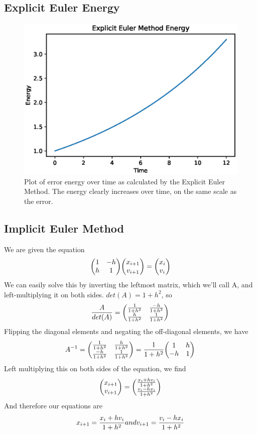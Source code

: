 \documentclass{article}
\begin{document}
\subsection{Explicit Euler Energy}

\begin{figure}[ht]
\centering
\includegraphics[scale=0.35]{exp_euler_energy.eps}
\caption{Plot of error energy over time as calculated by the Explicit Euler Method. The energy clearly increases over time, on the same scale as the error.}
\label{fig:expeulerenergy}
\end{figure}

\subsection{Implicit Euler Method}

We are given the equation 
$$
    \mqty(1 & -h \\ h & 1) \mqty(x_{i+1} \\ v_{i+1}) = \mqty(x_{i} \\ v_{i})
$$
We can easily solve this by inverting the leftmost matrix, which we'll call A, and left-multiplying it on both sides. $det(A) = 1 +h^2$, so 
$$
\frac{A}{det(A)} = \mqty(\frac{1}{1 + h^2} & \frac{-h}{1 + h^2} \\ \frac{h}{1 + h^2} & \frac{1}{1 + h^2})
$$
Flipping the diagonal elements and negating the off-diagonal elements, we have
$$
A^{-1} = \mqty(\frac{1}{1 + h^2} & \frac{h}{1 + h^2} \\ \frac{-h}{1 + h^2} & \frac{1}{1 + h^2}) = \frac{1}{1 + h^2} \mqty(1 & h \\ -h & 1)
$$
Left multiplying this on both sides of the equation, we find
$$
\mqty(x_{i+1} \\ v_{i+1}) = \mqty(\frac{x_{i} + h v_{i}}{1 + h^2} \\ \frac{v_{i} - h x_{i}}{1 + h^2})
$$
And therefore our equations are
$$
x_{i+1} = \frac{x_{i} + h v_{i}}{1 + h^2} \space and \space v_{i+1} = \frac{v_{i} - h x_{i}}{1 + h^2}
$$
\end{document}
